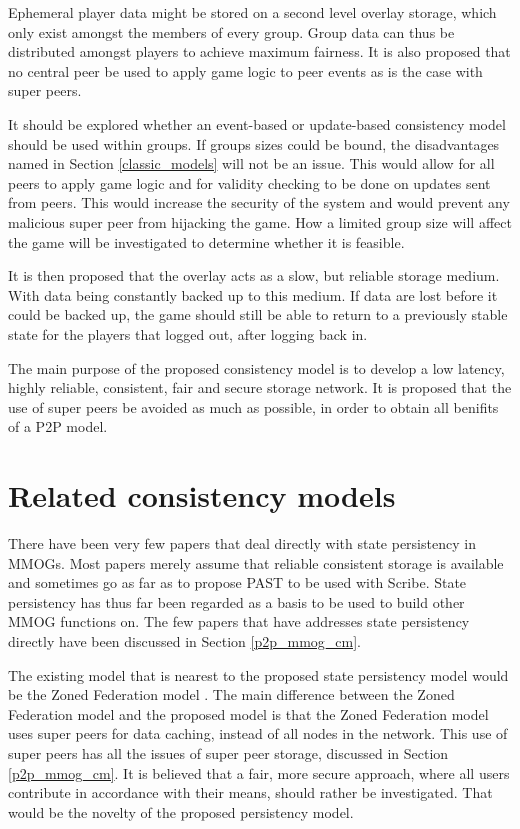 \documentclass[journal,oneside,a4paper,onecolumn]{IEEEtran}
\begin{document}
Ephemeral player data might be stored on a second level overlay storage, which only exist amongst the members of every group. Group data can thus be distributed amongst players to achieve maximum fairness. It is also proposed that no central peer be used to apply game logic to peer events as is the case with super peers.

It should be explored whether an event-based or update-based consistency model should be used within groups. If groups sizes could be bound, the disadvantages named in Section \ref{classic_models} will not be an issue. This would allow for all peers to apply game logic and for validity checking to be done on updates sent from peers. This would increase the security of the system and would prevent any malicious super peer from hijacking the game. How a limited group size will affect the game will be investigated to determine whether it is feasible.

It is then proposed that the overlay acts as a slow, but reliable storage medium. With data being constantly backed up to this medium. If data are lost before it could be backed up, the game should still be able to return to a previously stable state for the players that logged out, after logging back in.

The main purpose of the proposed consistency model is to develop a low latency, highly reliable, consistent, fair and secure storage network. It is proposed that the use of super peers be avoided as much as possible, in order to obtain all benifits of a P2P model.

\section{Related consistency models}
\label{related_cm}

There have been very few papers that deal directly with state persistency in MMOGs. Most papers merely assume that reliable consistent storage is available and sometimes go as far as to propose PAST to be used with Scribe. State persistency has thus far been regarded as a basis to be used to build other MMOG functions on. The few papers that have addresses state persistency directly have been discussed in Section \ref{p2p_mmog_cm}.

The existing model that is nearest to the proposed state persistency model would be the Zoned Federation model \cite{zoned_federation}. The main difference between the Zoned Federation model and the proposed model is that the Zoned Federation model uses super peers for data caching, instead of all nodes in the network. This use of super peers has all the issues of super peer storage, discussed in Section \ref{p2p_mmog_cm}. It is believed that a fair, more secure approach, where all users contribute in accordance with their means, should rather be investigated. That would be the novelty of the proposed persistency model.
\end{document}
